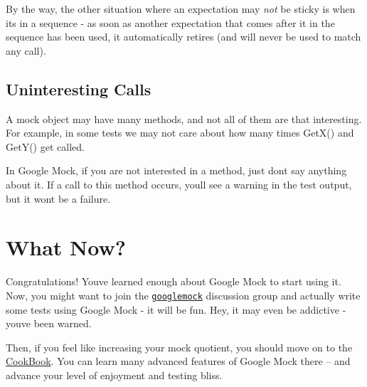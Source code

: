 By the way, the other situation where an expectation may {\itshape not} be sticky is when it\textquotesingle{}s in a sequence -\/ as soon as another expectation that comes after it in the sequence has been used, it automatically retires (and will never be used to match any call).

\subsection*{Uninteresting Calls}

A mock object may have many methods, and not all of them are that interesting. For example, in some tests we may not care about how many times {\ttfamily Get\+X()} and {\ttfamily Get\+Y()} get called.

In Google Mock, if you are not interested in a method, just don\textquotesingle{}t say anything about it. If a call to this method occurs, you\textquotesingle{}ll see a warning in the test output, but it won\textquotesingle{}t be a failure.

\section*{What Now?}

Congratulations! You\textquotesingle{}ve learned enough about Google Mock to start using it. Now, you might want to join the \href{http://groups.google.com/group/googlemock}{\tt googlemock} discussion group and actually write some tests using Google Mock -\/ it will be fun. Hey, it may even be addictive -\/ you\textquotesingle{}ve been warned.

Then, if you feel like increasing your mock quotient, you should move on to the \hyperlink{v1__7_2CookBook_8md}{Cook\+Book}. You can learn many advanced features of Google Mock there -- and advance your level of enjoyment and testing bliss. 